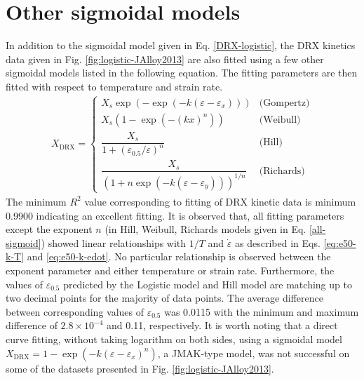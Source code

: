 \documentclass[a4paper, 11pt, dvipsnames]{article}
\begin{document}
\section{Other sigmoidal models}
In addition to the sigmoidal model given in Eq. \eqref{DRX-logistic}, the DRX kinetics data given in Fig. \ref{fig:logistic-JAlloy2013} are also fitted using a few other sigmoidal models listed in the following equation. The fitting parameters are then fitted with respect to temperature and strain rate. 
\begin{equation}\label{all-sigmoid}
\begin{aligned}
X_{\text{DRX}} = \begin{cases}
X_s\exp\left(-\exp(-k(\varepsilon-\varepsilon_x))\right)  &\text{(Gompertz)}\\
X_s\left(1-\exp(-(kx)^n)\right)  &\text{(Weibull)}\\
\dfrac{X_s}{1 + \left(\varepsilon_{0.5}/\varepsilon\right)^n} &\text{(Hill)}\\
\dfrac{X_s}{\left(1 + n\exp(-k(\varepsilon-\varepsilon_y))\right)^{1/n}} &\text{(Richards)}
\end{cases}
\end{aligned}
\end{equation}
The minimum $R^2$ value corresponding to fitting of DRX kinetic data is minimum 0.9900 indicating an excellent fitting. It is observed that, all fitting parameters except the exponent $n$ (in Hill, Weibull, Richards models given in Eq. \eqref{all-sigmoid}) showed linear relationships with $1/T$ and $\dot{\varepsilon}$ as described in Eqs. \eqref{eq:e50-k-T} and \eqref{eq:e50-k-edot}. No particular relationship is observed between the exponent parameter and either temperature or strain rate. Furthermore, the values of $\varepsilon_{0.5}$ predicted by the Logistic model and Hill model are matching up to two decimal points for the majority of data points. The average difference between corresponding values of $\varepsilon_{0.5}$ was 0.0115 with the minimum and maximum difference of $2.8 \times 10^{-4}$ and 0.11, respectively. It is worth noting that a direct curve fitting, without taking logarithm on both sides, using a sigmoidal model $X_{\text{DRX}} = 1 - \exp(-k(\varepsilon - \varepsilon_x)^n)$, a JMAK-type model, was not successful on some of the datasets presented in Fig. \ref{fig:logistic-JAlloy2013}.
\end{document}
